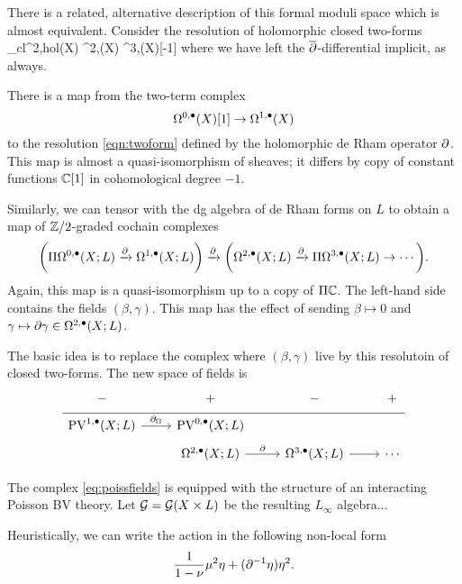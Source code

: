 \documentclass[11pt]{amsart}
\begin{document}
There is a related, alternative description of this formal moduli space which is almost equivalent. 
Consider the resolution of holomorphic closed two-forms 
\beqn\label{eqn:twoform}
\Omega_{cl}^{2,hol}(X) \simeq \Omega^{2,\bu}(X) \xto{\del} \Omega^{3,\bu}(X)[-1] \to \cdots 
\eeqn
where we have left the $\overline{\partial}$-differential implicit, as always. 

There is a map from the two-term complex 
\[
\Omega^{0,\bullet}(X)[1] \to \Omega^{1,\bullet}(X)
\]
to the resolution \eqref{eqn:twoform} defined by the holomorphic de Rham operator $\partial$. 
This map is almost a quasi-isomorphism of sheaves; it differs by copy of constant functions $\mathbb C[1]$ in cohomological degree $-1$. 

Similarly, we can tensor with the dg algebra of de Rham forms on $L$ to obtain a map of $\mathbb Z/2$-graded cochain complexes
\[
\bigg(\Pi \Omega^{0,\bullet}(X;L) \xrightarrow{\partial} \Omega^{1,\bullet}(X;L) \bigg) \xrightarrow{\partial} \bigg(\Omega^{2,\bullet}(X;L) \xrightarrow{\partial} \Pi \Omega^{3,\bullet}(X;L) \to \cdots \bigg) .
\]
Again, this map is a quasi-isomorphism up to a copy of $\Pi \mathbb C$.
The left-hand side contains the fields $(\beta, \gamma)$. 
This map has the effect of sending $\beta \mapsto 0$ and $\gamma \mapsto \partial \gamma \in \Omega^{2,\bullet}(X;L)$. 

The basic idea is to replace the complex where $(\beta,\gamma)$ live by this resolutoin of closed two-forms. 
The new space of fields is 
\begin{equation}
  \label{eq:poissfields} 
  \begin{tikzcd}[row sep = 1 ex]
     - & + & - & + \\ \hline
     \PV^{1,\bu}(X; L) \ar[r, "\div"] & \PV^{0,\bu}(X; L) \\
     & \Omega^{2,\bu}(X;L) \ar[r, "\del"] & \Omega^{3,\bu}(X;L) \ar[r] & \cdots 
\end{tikzcd}
\end{equation}

\begin{prop}
The complex \eqref{eq:poissfields} is equipped with the structure of an interacting Poisson BV theory.
Let $\mathcal G = \mathcal G(X \times L)$ be the resulting $L_\infty$ algebra...
\end{prop}

Heuristically, we can write the action in the following non-local form
\[
\frac{1}{1-\nu} \mu^2 \eta + (\partial^{-1} \eta) \eta^2 .
\]
\end{document}
